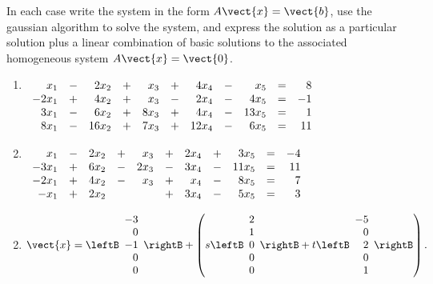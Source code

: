 \begin{multicols}{2}
\begin{ex}
In each case write the system in the form $A\vect{x} = \vect{b}$, use the gaussian algorithm to solve the system, and express the solution as a particular solution plus a linear combination of basic solutions to the associated homogeneous system $A\vect{x} = \vect{0}$.


\begin{enumerate}[label={\alph*.}]
\item \arraycolsep=1pt
$\begin{array}[t]{rrrrrrrrrrr}
x_{1} & - & 2x_{2} & + & x_{3} & + & 4x_{4} & - & x_{5} & = & 8 \\
-2x_{1} & + & 4x_{2} & + & x_{3} & - & 2x_{4} & - & 4x_{5} & = & -1 \\
3x_{1} & - & 6x_{2} & + & 8x_{3} & + & 4x_{4} & - & 13x_{5} & = & 1 \\
8x_{1} & - & 16x_{2} & + & 7x_{3} & + & 12x_{4} & - & 6x_{5} & = & 11
\end{array}
$

\item \arraycolsep=1pt
$\begin{array}[t]{rrrrrrrrrrr}
x_{1} & - & 2x_{2} & + & x_{3} & + & 2x_{4} & + & 3x_{5} & = & -4 \\
-3x_{1} & + & 6x_{2} & - & 2x_{3} & - & 3x_{4} & - & 11x_{5} & = & 11 \\
-2x_{1} & + & 4x_{2} & - & x_{3} & + & x_{4} & - & 8x_{5} & = & 7 \\
-x_{1} & + & 2x_{2} &  &  & + & 3x_{4} & - & 5x_{5} & = & 3
\end{array}
$

\end{enumerate}
\begin{sol}
\begin{enumerate}[label={\alph*.}]
\setcounter{enumi}{1}
\item
$\vect{x} = \leftB \begin{array}{r}
-3 \\
0 \\
-1 \\
0 \\
0
\end{array} \rightB + \left( s \leftB \begin{array}{r}
2 \\
1 \\
0 \\
0 \\
0
\end{array} \rightB + t \leftB \begin{array}{r}
-5 \\
0 \\
2 \\
0 \\
1
\end{array} \rightB \right).
$


\end{enumerate}
\end{sol}
\end{ex}
\end{multicols}
